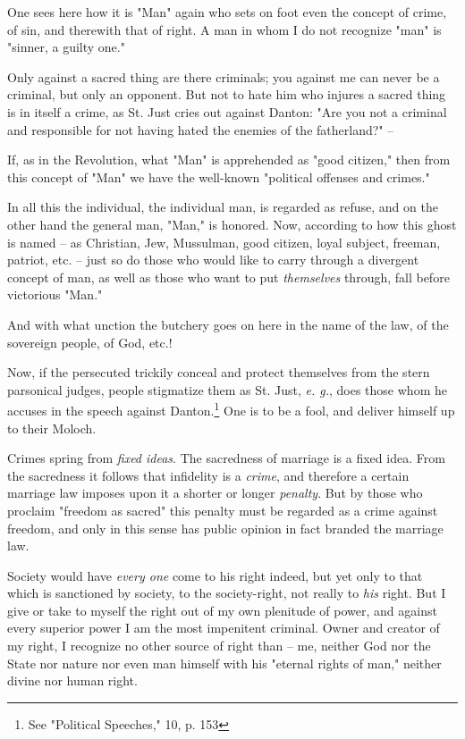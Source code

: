 One sees here how it is "{}Man"{} again who sets on foot even the concept of 
crime, of sin, and therewith that of right. A man in whom I do not recognize 
"{}man"{} is "{}sinner, a guilty one."{}

Only against a sacred thing are there criminals; you against me can never be a 
criminal, but only an opponent. But not to hate him who injures a sacred thing 
is in itself a crime, as St. Just cries out against Danton: "{}Are you not a 
criminal and responsible for not having hated the enemies of the 
fatherland?"{} --

If, as in the Revolution, what "{}Man"{} is apprehended as "{}good citizen,"{} 
then from this concept of "{}Man"{} we have the well-known "{}political 
offenses and crimes."{}

In all this the individual, the individual man, is regarded as refuse, and on 
the other hand the general man, "{}Man,"{} is honored. Now, according to how 
this ghost is named -- as Christian, Jew, Mussulman, good citizen, loyal 
subject, freeman, patriot, etc. -- just so do those who would like to carry 
through a divergent concept of man, as well as those who want to put 
\textit{themselves} through, fall before victorious "{}Man."{}

And with what unction the butchery goes on here in the name of the law, of the 
sovereign people, of God, etc.!

Now, if the persecuted trickily conceal and protect themselves from the stern 
parsonical judges, people stigmatize them as St. Just, \textit{e. g.}, does 
those whom he accuses in the speech against Danton.\footnote{See "{}Political 
Speeches,"{} 10, p. 153} One is to be a fool, and deliver himself up to their 
Moloch.

Crimes spring from \textit{fixed ideas}. The sacredness of marriage is a fixed 
idea. From the sacredness it follows that infidelity is a \textit{crime}, and 
therefore a certain marriage law imposes upon it a shorter or longer 
\textit{penalty}. But by those who proclaim "{}freedom as sacred"{} this 
penalty must be regarded as a crime against freedom, and only in this sense 
has public opinion in fact branded the marriage law.

Society would have \textit{every one} come to his right indeed, but yet only 
to that which is sanctioned by society, to the society-right, not really to 
\textit{his} right. But I give or take to myself the right out of my own 
plenitude of power, and against every superior power I am the most impenitent 
criminal. Owner and creator of my right, I recognize no other source of right 
than -- me, neither God nor the State nor nature nor even man himself with his 
"{}eternal rights of man,"{} neither divine nor human right.

